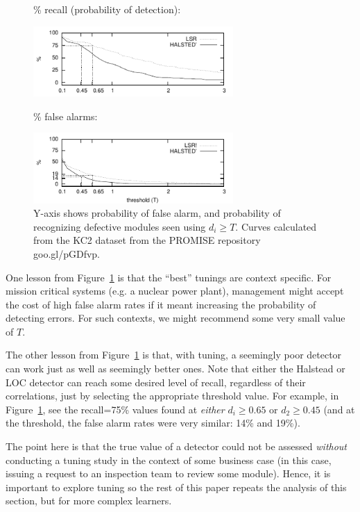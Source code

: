 \documentclass{sig-alternative}
\newcommand{\fig}[1]{Figure~\ref{fig:#1}}
\def\baselinestretch{1}
\begin{document}
 

\begin{figure}[!t] 

\renewcommand{\baselinestretch}{0.8}
{\scriptsize
\begin{center}

\% recall (probability of detection):   

\includegraphics[width=3in]{lsrvscostpd.pdf}

\% false alarms:

\includegraphics[width=3in]{lsrvscostpf.pdf}
\end{center}}
\caption{
 Y-axis shows probability of false alarm,
  and
  probability of recognizing defective modules  seen using \mbox{$d_i \ge T$}.
  Curves calculated from the KC2 dataset from the PROMISE repository goo.gl/pGDfvp.
 }\label{fig:pd1}
 \end{figure}


One   lesson from  \fig{pd1} is that the ``best'' tunings are context
specific. For mission critical systems (e.g. a nuclear power plant), management
might accept the cost of high false alarm rates if it meant increasing the probability
of detecting errors. For such contexts, we might recommend some very small value of $T$.

The other   lesson from   \fig{pd1}  is that, with tuning, a seemingly poor
detector can work just as well as seemingly better ones.
Note that either the Halstead or LOC detector can reach some desired
level of recall, regardless of their correlations, just by
selecting the appropriate threshold value. For example, in \fig{pd1}, see the recall=75\% values
found at {\em either} $d_i\ge 0.65$ or $d_2\ge 0.45$ (and at the threshold, the false alarm rates
were very similar: 14\% and 19\%).

The  point here is that   the true value of a detector
could not be assessed {\em without} conducting a  tuning study in the context of some business case (in this case, 
issuing a request to an inspection team to review some module).  
Hence, it is important to explore tuning
so the rest of this paper repeats the analysis of this section, but for 
more complex learners.
\end{document}
